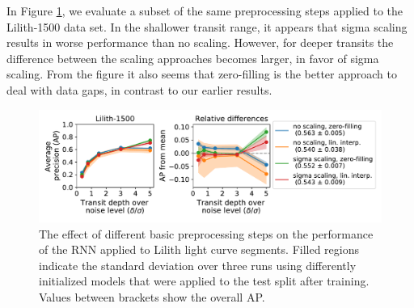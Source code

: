 In Figure \ref{fig:lilith_pp_basic}, we evaluate a subset of the same preprocessing steps applied to the Lilith-1500 data set. In the shallower transit range, it appears that sigma scaling results in worse performance than no scaling. However, for deeper transits the difference between the scaling approaches becomes larger, in favor of sigma scaling. From the figure it also seems that zero-filling is the better approach to deal with data gaps, in contrast to our earlier results.
\begin{figure}
    \centering
    \includegraphics[width=0.78\linewidth]{Experiments/Figures/Preprocessing/lilith1500_AP_pp-basic-gaps.pdf}
    \caption{The effect of different basic preprocessing steps on the performance of the RNN applied to Lilith light curve segments. Filled regions indicate the standard deviation over three runs using differently initialized models that were applied to the test split after training. Values between brackets show the overall AP.}
    \label{fig:lilith_pp_basic}
\end{figure}



